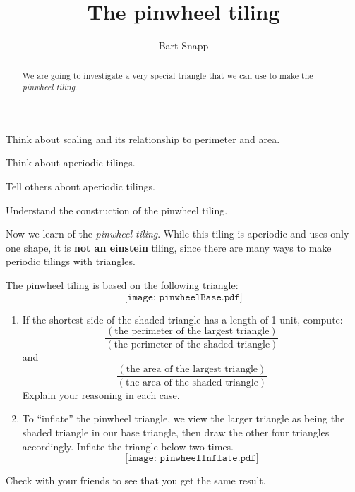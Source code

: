 \documentclass[noauthor,nooutcomes,handout,hints,12pt]{ximera}
\title{The pinwheel tiling}
\author{Bart Snapp}
\begin{document}
\begin{abstract}
   We are going to investigate a very special triangle that we can use
   to make the \textit{pinwheel tiling}.
\end{abstract}
\maketitle

\begin{listOutcomes}
\item Think about scaling and its relationship to perimeter and area.
\item Think about aperiodic tilings.
\item Tell others about aperiodic tilings.
\item Understand the construction of the pinwheel tiling.
\end{listOutcomes}

Now we learn of the \textit{pinwheel tiling}. While this tiling is
aperiodic and uses only one shape, it is \textbf{not an einstein}
tiling, since there are many ways to make periodic tilings with
triangles.


\mynewpage

\begin{question}
The pinwheel tiling is based on the following triangle:
\[
\texttt{[image: pinwheelBase.pdf]}
\]

\begin{enumerate}
\item If the shortest side of the shaded triangle has a length of 1
  unit, compute:
  \[
  \frac{(\text{the perimeter of the largest triangle})}{(\text{the perimeter of the shaded triangle})}
  \]
  and
  \[
      \frac{(\text{the area of the largest triangle})}{(\text{the area of the shaded triangle})}
  \]
Explain your reasoning in each case.

\vfill
  
\item To ``inflate'' the pinwheel triangle, we view the larger
  triangle as being the shaded triangle in our base triangle, then
  draw the other four triangles accordingly. Inflate the triangle
  below two times.
  \[
  \texttt{[image: pinwheelInflate.pdf]}
  \]
\end{enumerate}
Check with your friends to see that you get the same result.
\end{question}

\mynewpage
\end{document}
